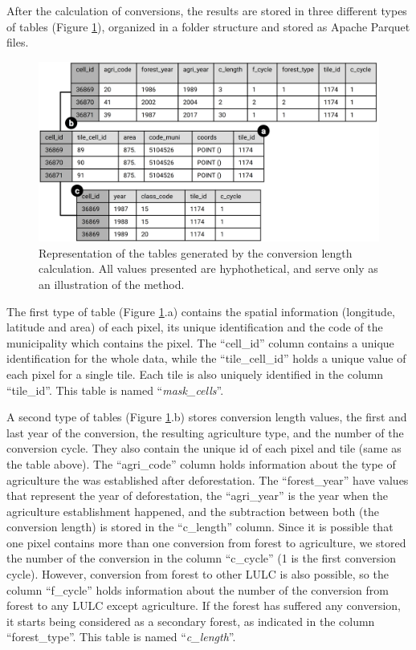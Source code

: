 \documentclass[essd, manuscript]{copernicus}
\begin{document}
After the calculation of conversions, the results are stored in three different types of tables (Figure \ref{fig:tables-plot}), organized in a folder structure and stored as Apache Parquet files.

\begin{figure}[h]
\includegraphics[width=17cm]{figs/tables_scheme} \caption{ Representation of the tables generated by the conversion length calculation. All values presented are hyphothetical, and serve only as an illustration of the method.}\label{fig:tables-plot}
\end{figure}

The first type of table (Figure \ref{fig:tables-plot}.a) contains the spatial information (longitude, latitude and area) of each pixel, its unique identification and the code of the municipality which contains the pixel.
The ``cell\_id'' column contains a unique identification for the whole data, while the ``tile\_cell\_id'' holds a unique value of each pixel for a single tile.
Each tile is also uniquely identified in the column ``tile\_id''.
This table is named ``\emph{mask\_cells}''.

A second type of tables (Figure \ref{fig:tables-plot}.b) stores conversion length values, the first and last year of the conversion, the resulting agriculture type, and the number of the conversion cycle.
They also contain the unique id of each pixel and tile (same as the table above).
The ``agri\_code'' column holds information about the type of agriculture the was established after deforestation.
The ``forest\_year'' have values that represent the year of deforestation, the ``agri\_year'' is the year when the agriculture establishment happened, and the subtraction between both (the conversion length) is stored in the ``c\_length'' column.
Since it is possible that one pixel contains more than one conversion from forest to agriculture, we stored the number of the conversion in the column ``c\_cycle'' (1 is the first conversion cycle).
However, conversion from forest to other LULC is also possible, so the column ``f\_cycle'' holds information about the number of the conversion from forest to any LULC except agriculture.
If the forest has suffered any conversion, it starts being considered as a secondary forest, as indicated in the column ``forest\_type''.
This table is named ``\emph{c\_length}''.
\end{document}
